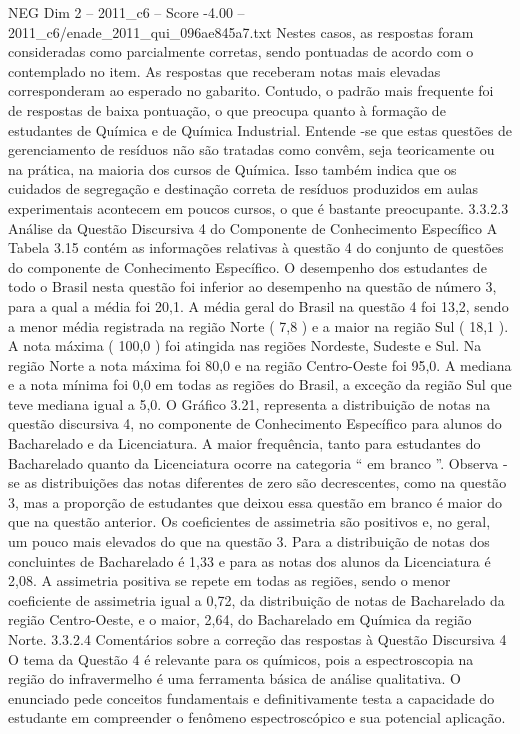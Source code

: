 \begin{textsample}{NEG Dim 2 – 2011\_c6 – Score -4.00 – 2011\_c6/enade\_2011\_qui\_096ae845a7.txt}
Nestes casos, as respostas foram consideradas como parcialmente corretas, sendo pontuadas de acordo com o contemplado no item.
As respostas que receberam notas mais elevadas corresponderam ao esperado no gabarito.
Contudo, o padrão mais frequente foi de respostas de baixa pontuação, o que preocupa quanto à formação de estudantes de Química e de Química Industrial.
Entende -se que estas questões de gerenciamento de resíduos não são tratadas como convêm, seja teoricamente ou na prática, na maioria dos cursos de Química.
Isso também indica que os cuidados de segregação e destinação correta de resíduos produzidos em aulas experimentais acontecem em poucos cursos, o que é bastante preocupante. 3.3.2.3 Análise da Questão Discursiva 4 do Componente de Conhecimento Específico A Tabela 3.15 contém as informações relativas à questão 4 do conjunto de questões do componente de Conhecimento Específico.
O desempenho dos estudantes de todo o Brasil nesta questão foi inferior ao desempenho na questão de número 3, para a qual a média foi 20,1.
A média geral do Brasil na questão 4 foi 13,2, sendo a menor média registrada na região Norte ( 7,8 ) e a maior na região Sul ( 18,1 ).
A nota máxima ( 100,0 ) foi atingida nas regiões Nordeste, Sudeste e Sul.
Na região Norte a nota máxima foi 80,0 e na região Centro-Oeste foi 95,0.
A mediana e a nota mínima foi 0,0 em todas as regiões do Brasil, a exceção da região Sul que teve mediana igual a 5,0.
O Gráfico 3.21, representa a distribuição de notas na questão discursiva 4, no componente de Conhecimento Específico para alunos do Bacharelado e da Licenciatura.
A maior frequência, tanto para estudantes do Bacharelado quanto da Licenciatura ocorre na categoria “ em branco ”.
Observa -se as distribuições das notas diferentes de zero são decrescentes, como na questão 3, mas a proporção de estudantes que deixou essa questão em branco é maior do que na questão anterior.
Os coeficientes de assimetria são positivos e, no geral, um pouco mais elevados do que na questão 3.
Para a distribuição de notas dos concluintes de Bacharelado é 1,33 e para as notas dos alunos da Licenciatura é 2,08.
A assimetria positiva se repete em todas as regiões, sendo o menor coeficiente de assimetria igual a 0,72, da distribuição de notas de Bacharelado da região Centro-Oeste, e o maior, 2,64, do Bacharelado em Química da região Norte. 3.3.2.4 Comentários sobre a correção das respostas à Questão Discursiva 4 O tema da Questão 4 é relevante para os químicos, pois a espectroscopia na região do infravermelho é uma ferramenta básica de análise qualitativa.
O enunciado pede conceitos fundamentais e definitivamente testa a capacidade do estudante em compreender o fenômeno espectroscópico e sua potencial aplicação.

\end{textsample}

